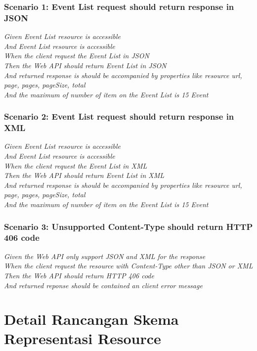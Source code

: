\documentclass[a4paper, 12pt, oneside]{report}
\begin{document}
\subsection{Scenario 1: Event List request should return response in JSON}

\onehalfspacing \textit{Given Event List resource is accessible\\
And Event List resource is accessible\\
When the client request the Event List in JSON\\
Then the Web API should return Event List in JSON\\
And returned response is should be accompanied by properties like resource url, page, pages, pageSize, total\\
And the maximum of number of item on the Event List is 15 Event}

\subsection{Scenario 2: Event List request should return response in XML}

\onehalfspacing \textit{Given Event List resource is accessible\\
And Event List resource is accessible\\
When the client request the Event List in XML\\
Then the Web API should return Event List in XML\\
And returned response is should be accompanied by properties like resource url, page, pages, pageSize, total\\
And the maximum of number of item on the Event List is 15 Event}

\subsection{Scenario 3: Unsupported Content-Type should return HTTP 406 code}

\onehalfspacing \textit{Given the Web API only support JSON and XML for the response\\
When the client request the resource with Content-Type other than JSON or XML\\
Then the Web API should return HTTP 406 code\\
And returned reponse should be contained an client error message}

\chapter{Detail Rancangan Skema Representasi Resource} \label{lampiran:b}
\end{document}
